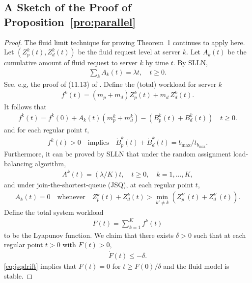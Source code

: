 \documentclass[11pt]{article}
\theoremstyle{plain}
\theoremstyle{definition}
\theoremstyle{remark}
\begin{document}
\subsection{A Sketch of the Proof of Proposition~\ref{pro:parallel}}\label{sec:proof-pro-parallel}

  \begin{proof}
  The fluid limit technique for proving Theorem~1 continues to apply
  here. Let $(Z^k_p(t), Z_d^k(t))$ be the fluid request level at
  server $k$.  Let $A_k(t)$ be the cumulative amount of fluid request
  to server $k$ by time $t$. By SLLN, 
  \begin{align}
      \sum_{k} A_k(t) = \lambda t, \quad t\ge 0.
  \end{align}
  See, e.g, the proof of (11.13) of \cite{dai2020processing}.
  Define the (total) workload for server $k$
  \begin{align*}
    f^k(t) = (m_p+m_d) Z^k_p(t)+ m_d\, Z^k_d(t).
  \end{align*}
  It follows that 
  \begin{align*}
      f^k(t)=f^k(0) + A_k(t)(m^k_p+m^k_d)-(B^k_p(t)+B^k_d(t)) \quad t\ge 0.
  \end{align*}
  and for each regular point $t$,
  \begin{align}\label{eq:conserve}
      f^k(t)>0 \quad \text{implies}\quad \dot B^k_p(t)+\dot B^k_d(t)=b_{\max}/t_{b_{\max}}.
  \end{align}
Furthermore, it can be proved by SLLN that 
under the random assignment load-balancing algorithm,  
\begin{align}\label{eq:ra}
  A^k(t)=(\lambda/K) t, \quad t\ge 0,  \quad k=1, \ldots, K, 
\end{align}
and 
under join-the-shortest-queue (JSQ), at each
  regular point $t$, 
\begin{align}\label{eq:jsq}
 \dot A_k(t)=0 \quad \text{whenever} \quad   Z^k_p(t)+Z^k_d(t) > \min_{k'\neq k}(Z^{k'}_p(t)+Z^{k'}_d(t)).
\end{align}
Define the total system workload
  \begin{align*}
    F(t)=\sum_{k=1}^K f^k(t)
  \end{align*}
  to be the Lyapunov function.
We claim that there exists $\delta>0$ such that  at each regular point $t>0$ with $F(t)>0$, 
\begin{align} \label{eq:jsqdrift}
    \dot F(t)\le -\delta.
\end{align}
\cref{eq:jsqdrift} implies that $F(t)=0$ for $t\ge F(0)/\delta$
and the fluid model is stable.


\end{proof}
\end{document}
